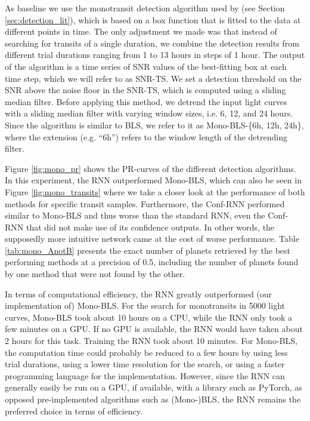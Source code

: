 As baseline we use the monotransit detection algorithm used by \cite{foreman2016population} (see Section \ref{sec:detection_lit}), which is based on a box function that is fitted to the data at different points in time. The only adjustment we made was that instead of searching for transits of a single duration, we combine the detection results from different trial durations ranging from 1 to 13 hours in steps of 1 hour. The output of the algorithm is a time series of SNR values of the best-fitting box at each time step, which we will refer to as SNR-TS. We set a detection threshold on the SNR above the noise floor in the SNR-TS, which is computed using a sliding median filter. Before applying this method, we detrend the input light curves with a sliding median filter with varying window sizes, i.e. 6, 12, and 24 hours. Since the algorithm is similar to BLS, we refer to it as Mono-BLS-\{6h, 12h, 24h\}, where the extension (e.g. ``6h'') refers to the window length of the detrending filter.

Figure \ref{fig:mono_pr} shows the PR-curves of the different detection algorithms. In this experiment, the RNN outperformed Mono-BLS, which can also be seen in Figure \ref{fig:mono_transits} where we take a closer look at the performance of both methods for specific transit samples. Furthermore, the Conf-RNN performed similar to Mono-BLS and thus worse than the standard RNN, even the Conf-RNN that did not make use of its confidence outputs. In other words, the supposedly more intuitive network came at the cost of worse performance. Table \ref{tab:mono_AnotB} presents the exact number of planets retrieved by the best performing methods at a precision of 0.5, including the number of planets found by one method that were not found by the other.

In terms of computational efficiency, the RNN greatly outperformed (our implementation of) Mono-BLS. For the search for monotransits in 5000 light curves, Mono-BLS took about 10 hours on a CPU, while the RNN only took a few minutes on a GPU. If no GPU is available, the RNN would have taken about 2 hours for this task. Training the RNN took about 10 minutes. For Mono-BLS, the computation time could probably be reduced to a few hours by using less trial durations, using a lower time resolution for the search, or using a faster programming language for the implementation. However, since the RNN can generally easily be run on a GPU, if available, with a library such as PyTorch, as opposed pre-implemented algorithms such as (Mono-)BLS, the RNN remains the preferred choice in terms of efficiency.

